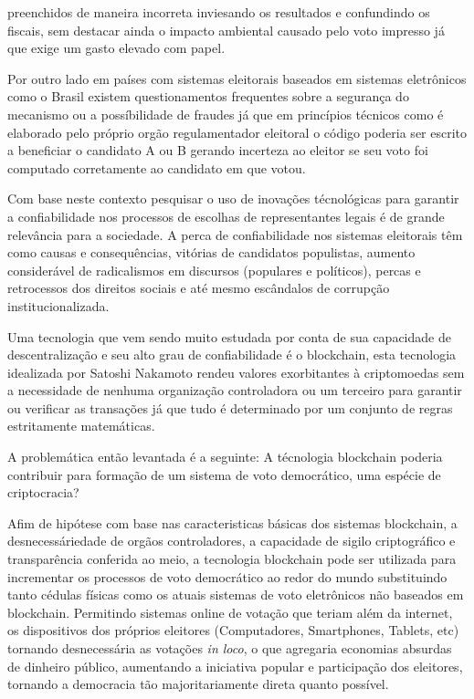 preenchidos de maneira incorreta inviesando os resultados e confundindo os fiscais, 
sem destacar ainda o impacto ambiental causado pelo voto impresso já que exige
um gasto elevado com papel.\par
Por outro lado em países com sistemas eleitorais baseados em sistemas eletrônicos
como o Brasil existem questionamentos frequentes sobre a segurança do mecanismo 
ou a possíbilidade de fraudes já que em princípios técnicos como é elaborado
pelo próprio orgão regulamentador eleitoral o código poderia ser escrito a 
beneficiar o candidato A ou B gerando incerteza ao eleitor se seu voto
foi computado corretamente ao candidato em que votou. \par
Com base neste contexto pesquisar o uso de inovações técnológicas para garantir a 
confiabilidade nos processos de escolhas de representantes legais é de grande relevância
para a sociedade. A perca de confiabilidade nos sistemas eleitorais têm como
causas e consequências, vitórias de candidatos populistas, aumento considerável
de radicalismos em discursos (populares e políticos), percas e retrocessos dos
direitos sociais e até mesmo escândalos de corrupção institucionalizada. \par
Uma tecnologia que vem sendo muito estudada por conta de sua capacidade de 
descentralização e seu alto grau de confiabilidade é o blockchain, esta tecnologia
idealizada por Satoshi Nakamoto \cite[Bitcoin P2P e-cash paper]{nakamoto2008re}
rendeu valores exorbitantes à criptomoedas sem a necessidade de nenhuma organização
controladora ou um terceiro para garantir ou verificar as transações já que tudo
é determinado por um conjunto de regras estritamente matemáticas. \par
A problemática então levantada é a seguinte: A técnologia blockchain poderia contribuir
para formação de um sistema de voto democrático, uma espécie de criptocracia? \par
Afim de hipótese com base nas caracteristicas básicas dos sistemas blockchain, 
a desnecessáriedade de orgãos controladores, a capacidade de sigilo criptográfico
e transparência conferida ao meio, a tecnologia blockchain pode ser
utilizada para incrementar os processos de voto democrático ao redor do mundo 
substituindo tanto cédulas físicas como os atuais sistemas de voto eletrônicos 
não baseados em blockchain. Permitindo sistemas online de votação que teriam 
além da internet, os dispositivos dos próprios eleitores (Computadores, Smartphones, 
Tablets, etc) tornando desnecessária as votações  \textit{in loco}, o que agregaria 
economias absurdas de dinheiro público, aumentando a iniciativa popular e participação dos eleitores, tornando a democracia tão 
majoritariamente direta quanto possível. \par
